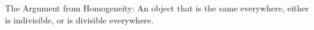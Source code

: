 \documentclass[preview]{standalone}
\begin{document}
\begin{center}
The Argument from Homogeneity: An object that is the same everywhere, either is indivisible, or is divisible everywhere.
\end{center}
\end{document}
